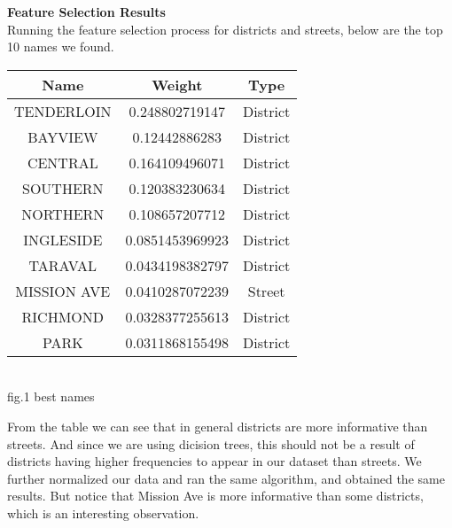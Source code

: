 \documentclass[12pt]{article}
\newenvironment{p4}[2][Results and Evaluation]{\begin{trivlist}
\item[\hskip \labelsep {\bfseries #1}\hskip \labelsep {\bfseries #2}]}{\end{trivlist}}
\begin{document}
\begin{p4}{}
\item{\textbf{Feature Selection Results}\\}
Running the feature selection process for districts and streets, below are the top 10 names we found.
\begin{center}
	\begin{tabular}{||c c c||} 
		\hline
	   	Name & Weight & Type\\
		\hline
		TENDERLOIN & 0.248802719147 & District\\
		\hline
		BAYVIEW  & 0.12442886283 & District\\
		\hline
		CENTRAL  & 0.164109496071 & District\\
		\hline
		SOUTHERN & 0.120383230634 & District\\
		\hline
		NORTHERN & 0.108657207712 & District\\
		\hline
		INGLESIDE & 0.0851453969923 & District\\
		\hline
		TARAVAL & 0.0434198382797 & District\\
		\hline
		MISSION AVE & 0.0410287072239 & Street\\
		\hline
		RICHMOND & 0.0328377255613 & District\\
		\hline
		PARK & 0.0311868155498 & District\\
		\hline
	\end{tabular}
	{\\fig.1 best names}
\end{center}
From the table we can see that in general districts are more informative than streets. And since we are using dicision trees, this should not be a result of districts having higher frequencies to appear in our dataset than streets. We further normalized our data and ran the same algorithm, and obtained the same results. But notice that Mission Ave is more informative than some districts, which is an interesting observation.
\end{p4}

 
\end{document}
